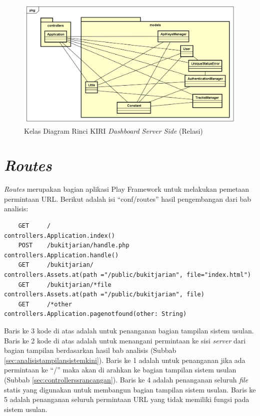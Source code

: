 \begin{figure}[htbp]
	\centering
		\includegraphics[scale=0.55]{Gambar/4_classdiagram_relasi.png}
	\caption{Kelas Diagram Rinci KIRI \textit{Dashboard Server Side} (Relasi)}
	\label{fig:4_classdiagramrelasi}
\end{figure}

\section{\textit{Routes}}
\label{sec:perancanganroutes}
\textit{Routes} merupakan bagian aplikasi Play Framework untuk melakukan pemetaan permintaan URL. Berikut adalah isi ``conf/routes'' hasil pengembangan dari bab analisis:
\begin{lstlisting}
	GET		/	 		 					 controllers.Application.index()
	POST	/bukitjarian/handle.php	 		 controllers.Application.handle()
	GET     /bukitjarian/		             controllers.Assets.at(path ="/public/bukitjarian", file="index.html")
	GET     /bukitjarian/*file         		 controllers.Assets.at(path ="/public/bukitjarian", file)
	GET     /*other	         		 	     controllers.Application.pagenotfound(other: String)
\end{lstlisting}

Baris ke 3 kode di atas adalah untuk penanganan bagian tampilan sistem usulan. Baris ke 2 kode di atas adalah untuk menangani permintaan ke sisi \textit{server} dari bagian tampilan berdasarkan hasil bab analisis (Subbab \ref{sec:analisistampilansistemkini}). Baris ke 1 adalah untuk penanganan jika ada permintaan ke ``/'' maka akan di arahkan ke bagian tampilan sistem usulan (Subbab \ref{sec:controllerssrancangan}). Baris ke 4 adalah penanganan seluruh \textit{file} statis yang digunakan untuk membangun bagian tampilan sistem usulan. Baris ke 5 adalah penanganan seluruh permintaan URL yang tidak memiliki fungsi pada sistem usulan.

